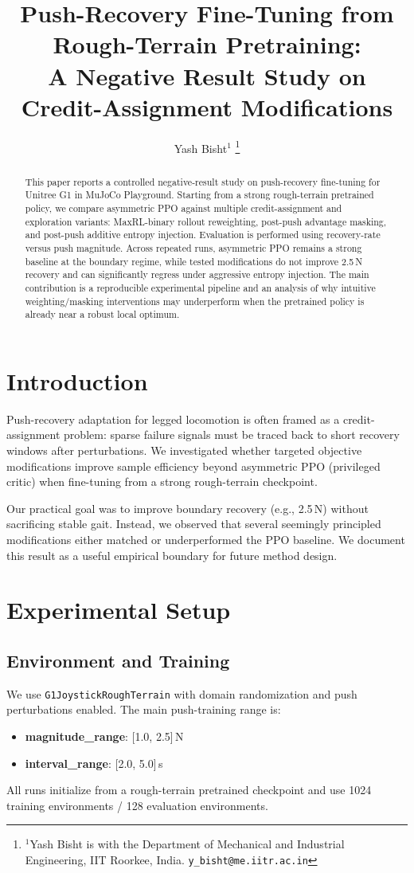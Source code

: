 \documentclass[letterpaper, 10 pt, conference]{ieeeconf}
\title{\LARGE \bf
Push-Recovery Fine-Tuning from Rough-Terrain Pretraining:\\
A Negative Result Study on Credit-Assignment Modifications}
\author{
Yash Bisht$^{1}$%
\thanks{$^{1}$Yash Bisht is with the Department of Mechanical and Industrial Engineering, IIT Roorkee, India.
{\tt\small y\_bisht@me.iitr.ac.in}}
}
\begin{document}
\maketitle
\thispagestyle{empty}
\pagestyle{empty}

\begin{abstract}
This paper reports a controlled negative-result study on push-recovery fine-tuning for Unitree G1 in MuJoCo Playground. Starting from a strong rough-terrain pretrained policy, we compare asymmetric PPO against multiple credit-assignment and exploration variants: MaxRL-binary rollout reweighting, post-push advantage masking, and post-push additive entropy injection. Evaluation is performed using recovery-rate versus push magnitude. Across repeated runs, asymmetric PPO remains a strong baseline at the boundary regime, while tested modifications do not improve 2.5\,N recovery and can significantly regress under aggressive entropy injection. The main contribution is a reproducible experimental pipeline and an analysis of why intuitive weighting/masking interventions may underperform when the pretrained policy is already near a robust local optimum.
\end{abstract}

\section{Introduction}
Push-recovery adaptation for legged locomotion is often framed as a credit-assignment problem: sparse failure signals must be traced back to short recovery windows after perturbations. We investigated whether targeted objective modifications improve sample efficiency beyond asymmetric PPO (privileged critic) when fine-tuning from a strong rough-terrain checkpoint.

Our practical goal was to improve boundary recovery (e.g., 2.5\,N) without sacrificing stable gait. Instead, we observed that several seemingly principled modifications either matched or underperformed the PPO baseline. We document this result as a useful empirical boundary for future method design.

\section{Experimental Setup}
\subsection{Environment and Training}
We use \texttt{G1JoystickRoughTerrain} with domain randomization and push perturbations enabled. The main push-training range is:
\begin{itemize}
  \item \textbf{magnitude\_range}: [1.0, 2.5]\,N
  \item \textbf{interval\_range}: [2.0, 5.0]\,s
\end{itemize}
All runs initialize from a rough-terrain pretrained checkpoint and use 1024 training environments / 128 evaluation environments.
\end{document}
